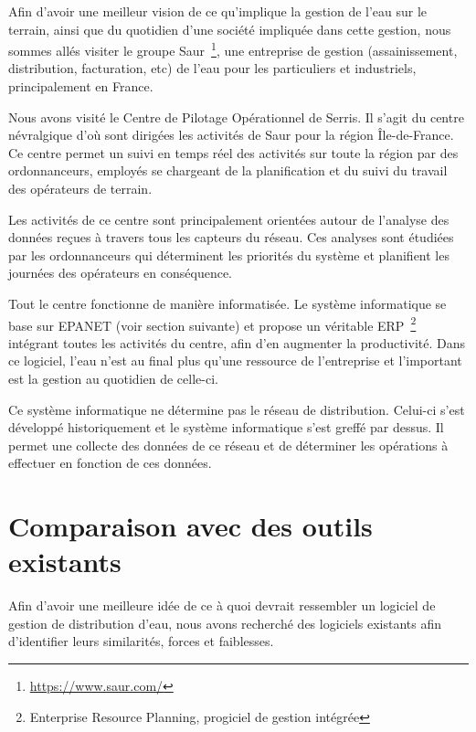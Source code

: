 \documentclass{EPL-master-thesis-covers-FR}
\begin{document}
				Afin d'avoir une meilleur vision de ce qu'implique la gestion de l'eau sur le terrain, ainsi que du quotidien d'une société impliquée dans cette gestion, nous sommes allés visiter le groupe Saur~\footnote{\url{https://www.saur.com/}}, une entreprise de gestion (assainissement, distribution, facturation, etc) de l'eau pour les particuliers et industriels, principalement en France.

				Nous avons visité le Centre de Pilotage Opérationnel de Serris. Il s'agit du centre névralgique d'où sont dirigées les activités de Saur pour la région Île-de-France. Ce centre permet un suivi en temps réel des activités sur toute la région par des ordonnanceurs, employés se chargeant de la planification et du suivi du travail des opérateurs de terrain.

				Les activités de ce centre sont principalement orientées autour de l'analyse des données reçues à travers tous les capteurs du réseau. Ces analyses sont étudiées par les ordonnanceurs qui déterminent les priorités du système et planifient les journées des opérateurs en conséquence.

				Tout le centre fonctionne de manière informatisée. Le système informatique se base sur EPANET (voir section suivante) et propose un véritable ERP~\footnote{Enterprise Resource Planning, progiciel de gestion intégrée} intégrant toutes les activités du centre, afin d'en augmenter la productivité. Dans ce logiciel, l'eau n'est au final plus qu'une ressource de l'entreprise et l'important est la gestion au quotidien de celle-ci.

				Ce système informatique ne détermine pas le réseau de distribution. Celui-ci s'est développé historiquement et le système informatique s'est greffé par dessus. Il permet une collecte des données de ce réseau et de déterminer les opérations à effectuer en fonction de ces données.

		\section{Comparaison avec des outils existants}
			\label{sec:outils_existants}

			Afin d'avoir une meilleure idée de ce à quoi devrait ressembler un logiciel de gestion de distribution d'eau, nous avons recherché des logiciels existants afin d'identifier leurs similarités, forces et faiblesses.
\end{document}
